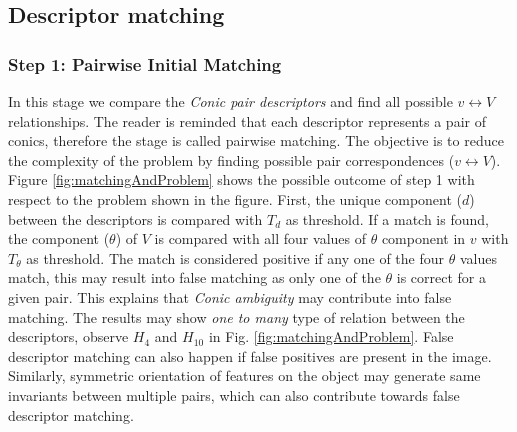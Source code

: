 \documentclass{bmvc2k}
\begin{document}
\subsection{Descriptor matching}
\label{ssec:matching}

\subsubsection{Step 1: Pairwise Initial Matching}
\label{subsubSec:PIM}
In this stage we compare the \textit{Conic pair descriptors} and find all possible $ v \leftrightarrow V $ relationships.
The reader is reminded that each descriptor represents a pair of conics, therefore the stage is called pairwise matching.
The objective is to reduce the complexity of the problem by finding possible pair correspondences ($ v \leftrightarrow V $). 
Figure \ref{fig:matchingAndProblem} shows the possible outcome of step 1 with respect to the problem shown in the figure.
First, the unique component ($ d $) between the descriptors is compared with $ T_d $ as threshold.
If a match is found, the component ($ \theta $) of $ V $ is compared with all four values of $ \theta $ component in $ v $ with $ T_\theta $ as threshold.
The match is considered positive if any one of the four $ \theta $ values match, this may result into false matching as only one of the $ \theta $ is correct for a given pair. 
This explains that \textit{Conic ambiguity} may contribute into false matching. 
The results may show \textit{one to many} type of relation between the descriptors, observe $ H_4 $ and $ H_{10} $ in Fig. \ref{fig:matchingAndProblem}. 
False descriptor matching can also happen if false positives are present in the image. 
Similarly, symmetric orientation of features on the object may generate same invariants between multiple pairs, which can also contribute towards false descriptor matching. 

\end{document}
